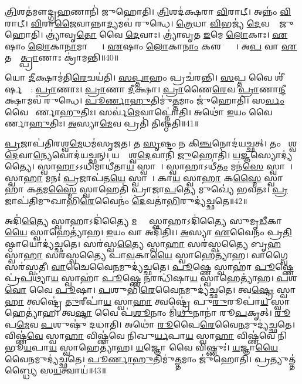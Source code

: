 \ul{𑌤𑍍𑌰𑌿}\ul{}𑌶𑌤॑𑌮𑍗𑌦𑍍𑌗𑍍𑌰\ul{𑌹}𑌣𑌾𑌨𑌿॑ 𑌜𑍁𑌹𑍋𑌤𑌿।
\ul{𑌤𑍍𑌰𑌿}\ul{}𑌶𑌦॑𑌕𑍍𑌷𑌰𑌾 \ul{𑌵𑌿}𑌰𑌾𑌟𑍍।
𑌅𑌨𑍍𑌨𑌂॑ \ul{𑌵𑌿}𑌰𑌾𑌟𑍍।
\ul{𑌵𑌿}𑌰𑌾\ul{𑌜𑍈}𑌵𑌾𑌨𑍍𑌨𑌾\ul{𑌦𑍍𑌯}𑌮𑌵॑ 𑌰𑍁𑌨𑍍𑌧𑍇।
\ul{𑌤𑍍𑌰𑍇}𑌧𑌾 \ul{𑌵𑌿}𑌭𑌜𑍍𑌯॑ \ul{𑌦𑍇}𑌵𑌤𑌾𑌂᳚ 𑌜𑍁𑌹𑍋𑌤𑌿।
𑌤𑍍𑌰𑍍𑌯𑌾॑𑌵𑍃\ul{𑌤𑍋} 𑌵𑍈 \ul{𑌦𑍇}𑌵𑌾𑌃।
𑌤𑍍𑌰𑍍𑌯𑌾॑𑌵𑍃𑌤 \ul{𑌇}𑌮𑍇 \ul{𑌲𑍋}𑌕𑌾𑌃।
\ul{𑌏}𑌷𑌾𑌂 \ul{𑌲𑍋}𑌕𑌾\ul{𑌨𑌾}𑌮𑌾𑌪𑍍𑌤𑍍𑌯𑍈᳚।
\ul{𑌏}𑌷𑌾𑌂 \ul{𑌲𑍋}𑌕𑌾\ul{𑌨𑌾𑌂} 𑌕𑍢𑌪𑍍𑌤𑍍𑌯𑍈᳚।
𑌅\ul{𑌪} 𑌵𑌾 \ul{𑌏}𑌤𑌸𑍍𑌮𑌾᳚\ul{𑌤𑍍𑌪𑍍𑌰𑌾}𑌣𑌾𑌃 𑌕𑍍𑌰𑌾॑𑌮𑌨𑍍𑌤𑌿॥40॥

𑌯𑍋 \ul{𑌦𑍀}𑌕𑍍𑌷𑌾𑌮॑𑌤𑌿\ul{𑌰𑍇}𑌚𑌯॑𑌤𑌿।
\ul{𑌸}\ul{𑌪𑍍𑌤𑌾}𑌹𑌂 𑌪𑍍𑌰𑌚॑𑌰𑌨𑍍𑌤𑌿।
\ul{𑌸}𑌪𑍍𑌤 𑌵𑍈 𑌶𑍀॑𑌰𑍍\mbox{}\ul{𑌷}𑌣𑍍𑌯𑌾᳚: \ul{𑌪𑍍𑌰𑌾}𑌣𑌾𑌃।
\ul{𑌪𑍍𑌰𑌾}𑌣𑌾 \ul{𑌦𑍀}𑌕𑍍𑌷𑌾।
\ul{𑌪𑍍𑌰𑌾}𑌣𑍈\ul{𑌰𑍇}𑌵 \ul{𑌪𑍍𑌰𑌾}𑌣𑌾\ul{𑌨𑍍𑌦𑍀}𑌕𑍍𑌷𑌾𑌮𑌵॑ 𑌰𑍁𑌨𑍍𑌧𑍇।
\ul{𑌪𑍂}\ul{𑌰𑍍𑌣𑌾}\ul{𑌹𑍁}𑌤𑌿𑌮𑍁॑\ul{𑌤𑍍𑌤}𑌮𑌾𑌂 𑌜𑍁॑𑌹𑍋𑌤𑌿।
𑌸\ul{𑌰𑍍𑌵𑌂} 𑌵𑍈 𑌪𑍂᳚𑌰𑍍𑌣𑌾\ul{𑌹𑍁}𑌤𑌿𑌃।
𑌸𑌰𑍍𑌵॑\ul{𑌮𑍇}𑌵𑌾𑌪𑍍𑌨𑍋॑𑌤𑌿।
𑌅𑌥𑍋॑ \ul{𑌇}𑌯𑌂 𑌵𑍈 𑌪𑍂᳚𑌰𑍍𑌣𑌾\ul{𑌹𑍁}𑌤𑌿𑌃।
\ul{𑌅}𑌸𑍍𑌯𑌾\ul{𑌮𑍇}𑌵 𑌪𑍍𑌰𑌤𑌿॑ 𑌤𑌿𑌷𑍍𑌠𑌤𑌿॥41॥\anuvakamend[\ul{𑌰𑍁}\ul{𑌨𑍍𑌧𑍇} \ul{𑌪𑍍𑌰𑌾}𑌣𑌾\ul{𑌨𑍍𑌦𑍀}𑌕𑍍𑌷𑌾𑌮𑌵॑ 𑌰𑍁𑌨𑍍𑌧 𑌉𑌚𑍍𑌯𑌤𑍇 𑌕𑍍𑌰𑌾𑌮𑌨𑍍𑌤𑌿 𑌤𑌿𑌷𑍍𑌠𑌤𑌿]

\ul{𑌪𑍍𑌰}𑌜𑌾𑌪॑𑌤𑌿𑌰𑌶𑍍𑌵\ul{𑌮𑍇}𑌧𑌮॑𑌸𑍃𑌜𑌤।
𑌤 \ul{𑌸𑍃}𑌷𑍍𑌟𑌂 𑌨 𑌕𑌿\ul{𑌞𑍍𑌚}𑌨𑍋𑌦॑𑌯𑌚𑍍𑌛𑌤𑍍।
𑌤𑌂 𑌵𑍈᳚𑌶𑍍𑌵\ul{𑌦𑍇}𑌵𑌾\ul{𑌨𑍍𑌯𑍇}𑌵𑍋𑌦॑𑌯𑌚𑍍𑌛𑌨𑍍।
𑌯𑌦𑍍𑌵𑍈᳚𑌶𑍍𑌵\ul{𑌦𑍇}𑌵𑌾𑌨𑌿॑ \ul{𑌜𑍁}𑌹𑍋𑌤𑌿॑।
\ul{𑌯}𑌜𑍍𑌞𑌸𑍍𑌯𑍋𑌦𑍍𑌯॑𑌤𑍍𑌯𑍈।
𑌸𑍍𑌵𑌾\ul{𑌹𑌾}\-𑌽𑌽𑌧𑌿𑌮𑌾𑌧𑍀॑𑌤𑌾\ul{𑌯} 𑌸𑍍𑌵𑌾𑌹𑌾᳚।
𑌸𑍍𑌵𑌾𑌹𑌾\-𑌽𑌧𑍀॑\ul{𑌤𑌂} 𑌮𑌨॑\ul{𑌸𑍇} 𑌸𑍍𑌵𑌾𑌹𑌾᳚।
𑌸𑍍𑌵𑌾\ul{𑌹𑌾} 𑌮𑌨𑌃॑ \ul{𑌪𑍍𑌰}𑌜𑌾𑌪॑𑌤\ul{𑌯𑍇} 𑌸𑍍𑌵𑌾𑌹𑌾᳚।
𑌕𑌾\ul{𑌯} 𑌸𑍍𑌵𑌾\ul{𑌹𑌾} 𑌕\ul{𑌸𑍍𑌮𑍈} 𑌸𑍍𑌵𑌾𑌹𑌾॑ 𑌕\ul{𑌤}𑌮\ul{𑌸𑍍𑌮𑍈} 𑌸𑍍𑌵𑌾𑌹𑍇𑌤𑌿॑ 𑌪𑍍𑌰𑌾𑌜𑌾\ul{𑌪}𑌤𑍍𑌯𑍇 𑌮𑍁𑌖𑍍𑌯𑍇॑ 𑌭𑌵𑌤𑌃।
\ul{𑌪𑍍𑌰}𑌜𑌾𑌪॑𑌤𑌿𑌮𑍁𑌖𑌾𑌭𑌿\ul{𑌰𑍇}𑌵𑍈𑌨𑌂॑ \ul{𑌦𑍇}𑌵𑌤𑌾॑\ul{𑌭𑌿}𑌰𑍁𑌦𑍍𑌯॑𑌚𑍍𑌛𑌤𑍇॥42॥

𑌅𑌦𑌿॑\ul{𑌤𑍍𑌯𑍈} 𑌸𑍍𑌵𑌾𑌹𑌾\-𑌽𑌦𑌿॑𑌤𑍍𑌯𑍈 \ul{𑌮}𑌹𑍍𑌯𑍈᳚ 𑌸𑍍𑌵𑌾𑌹𑌾\-𑌽𑌦𑌿॑𑌤𑍍𑌯𑍈 𑌸𑍁𑌮𑍃\ul{𑌡𑍀}𑌕𑌾\ul{𑌯𑍈} 𑌸𑍍𑌵𑌾𑌹𑍇𑌤𑍍𑌯𑌾॑𑌹।
\ul{𑌇}𑌯𑌂 𑌵𑌾 𑌅𑌦𑌿॑𑌤𑌿𑌃।
\ul{𑌅}𑌸𑍍𑌯𑌾 \ul{𑌏}𑌵𑍈𑌨𑌂॑ 𑌪𑍍𑌰\ul{𑌤𑌿}𑌷𑍍𑌠𑌾𑌯𑍋𑌦𑍍𑌯॑𑌚𑍍𑌛𑌤𑍇।
𑌸𑌰॑𑌸𑍍𑌵\ul{𑌤𑍍𑌯𑍈} 𑌸𑍍𑌵𑌾\ul{𑌹𑌾} 𑌸𑌰॑𑌸𑍍𑌵𑌤𑍍𑌯𑍈 𑌬𑍃\ul{𑌹}𑌤𑍍𑌯𑍈᳚ 𑌸𑍍𑌵𑌾\ul{𑌹𑌾} 𑌸𑌰॑𑌸𑍍𑌵𑌤𑍍𑌯𑍈 𑌪𑌾\ul{𑌵}𑌕𑌾\ul{𑌯𑍈} 𑌸𑍍𑌵𑌾𑌹𑍇𑌤𑍍𑌯𑌾॑𑌹।
𑌵𑌾𑌗𑍍𑌵𑍈 𑌸𑌰॑𑌸𑍍𑌵𑌤𑍀।
\ul{𑌵𑌾}𑌚𑍈𑌵𑍈\ul{𑌨}𑌮𑍁𑌦𑍍𑌯॑𑌚𑍍𑌛𑌤𑍇।
\ul{𑌪𑍂}𑌷𑍍𑌣𑍇 𑌸𑍍𑌵𑌾𑌹𑌾॑ \ul{𑌪𑍂}𑌷𑍍𑌣𑍇 𑌪𑍍𑌰॑\ul{𑌪}𑌥𑍍𑌯𑌾॑\ul{𑌯} 𑌸𑍍𑌵𑌾𑌹𑌾॑ \ul{𑌪𑍂}𑌷𑍍𑌣𑍇 \ul{𑌨}𑌰𑌨𑍍𑌧𑌿॑𑌷𑌾\ul{𑌯} 𑌸𑍍𑌵𑌾𑌹𑍇𑌤𑍍𑌯𑌾॑𑌹।
\ul{𑌪}𑌶\ul{𑌵𑍋} 𑌵𑍈 \ul{𑌪𑍂}𑌷𑌾।
\ul{𑌪}𑌶𑍁𑌭𑌿॑\ul{𑌰𑍇}𑌵𑍈\ul{𑌨}𑌮𑍁𑌦𑍍𑌯॑𑌚𑍍𑌛𑌤𑍇।
𑌤𑍍𑌵\ul{𑌷𑍍𑌟𑍍𑌰𑍇} 𑌸𑍍𑌵𑌾\ul{𑌹𑌾} 𑌤𑍍𑌵𑌷𑍍𑌟𑍍𑌰𑍇॑ \ul{𑌤𑍁}𑌰𑍀𑌪𑌾॑\ul{𑌯} 𑌸𑍍𑌵𑌾\ul{𑌹𑌾} 𑌤𑍍𑌵𑌷𑍍𑌟𑍍𑌰𑍇॑ 𑌪𑍁\ul{𑌰𑍁}𑌰𑍂𑌪𑌾॑\ul{𑌯} 𑌸𑍍𑌵𑌾𑌹𑍇𑌤𑍍𑌯𑌾॑𑌹।
𑌤𑍍𑌵\ul{𑌷𑍍𑌟𑌾} 𑌵𑍈 𑌪॑\ul{𑌶𑍂}𑌨𑌾𑌂 𑌮𑌿॑\ul{𑌥𑍁}𑌨𑌾𑌨𑌾॑ 𑌰𑍂\ul{𑌪}𑌕𑍃𑌤𑍍।
\ul{𑌰𑍂}𑌪\ul{𑌮𑍇}𑌵 \ul{𑌪}𑌶𑍁𑌷𑍁॑ 𑌦𑌧𑌾𑌤𑌿।
𑌅𑌥𑍋॑ \ul{𑌰𑍂}𑌪𑍈\ul{𑌰𑍇}𑌵𑍈\ul{𑌨}𑌮𑍁𑌦𑍍𑌯॑𑌚𑍍𑌛𑌤𑍇।
𑌵𑌿𑌷𑍍𑌣॑\ul{𑌵𑍇} 𑌸𑍍𑌵𑌾\ul{𑌹𑌾} 𑌵𑌿𑌷𑍍𑌣॑𑌵𑍇 𑌨𑌿𑌖𑍁\ul{𑌰𑍍𑌯}𑌪𑌾\ul{𑌯} 𑌸𑍍𑌵𑌾\ul{𑌹𑌾} 𑌵𑌿𑌷𑍍𑌣॑𑌵𑍇 𑌨𑌿𑌭𑍂\ul{𑌯}𑌪𑌾\ul{𑌯} 𑌸𑍍𑌵𑌾𑌹𑍇𑌤𑍍𑌯𑌾॑𑌹।
\ul{𑌯}𑌜𑍍𑌞𑍋 𑌵𑍈 𑌵𑌿𑌷𑍍𑌣𑍁𑌃॑।
\ul{𑌯}𑌜𑍍𑌞𑌾\ul{𑌯𑍈}𑌵𑍈\ul{𑌨}𑌮𑍁𑌦𑍍𑌯॑𑌚𑍍𑌛𑌤𑍇।
\ul{𑌪𑍂}\ul{𑌰𑍍𑌣𑌾}\ul{𑌹𑍁}𑌤𑌿𑌮𑍁॑\ul{𑌤𑍍𑌤}𑌮𑌾𑌂 𑌜𑍁॑𑌹𑍋𑌤𑌿।
𑌪𑍍𑌰𑌤𑍍𑌯𑍁𑌤𑍍𑌤॑𑌬𑍍𑌧𑍍𑌯𑍈 𑌸\ul{𑌯}𑌤𑍍𑌵𑌾𑌯॑॥43॥\anuvakamend[\ul{𑌯}\ul{𑌚𑍍𑌛}\ul{𑌤𑍇} \ul{𑌪𑍁}\ul{𑌰𑍁}𑌰𑍂𑌪𑌾॑\ul{𑌯} 𑌸𑍍𑌵𑌾𑌹𑍇𑌤𑍍𑌯𑌾॑\ul{𑌹𑌾}𑌷𑍍𑌟𑍗 𑌚॑]

